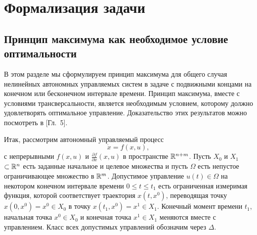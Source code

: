 \section{Формализация задачи}

\subsection{Принцип максимума как необходимое условие оптимальности}

В этом разделе мы сформулируем принцип максимума для общего случая нелинейных автономных управляемых систем в задаче с подвижными концами на конечном или бесконечном интервале времени. Принцип максимума, вместе с условиями трансверсальности, является необходимым условием, которому должно удовлетворять оптимальное управление. Доказательство этих результатов можно посмотреть в \cite{li}[Гл.~5].
        
Итак, рассмотрим автономный управляемый процесс
$$
        \dot x = f(x, u),
$$
с непрерывными $f(x, u)$ и $\frac{\partial f}{\partial x}(x, u)$ в пространстве $\mathbb{R}^{n+m}$. Пусть $X_0$ и $X_1$ $\subset \mathbb{R}^n$ есть заданные начальное и целевое множества и пусть $\Omega$ есть непустое ограничивающее множество в $\mathbb{R}^m$. Допустимое управление $u(t) \in \Omega$ на некотором конечном интервале времени $0 \leqslant t \leqslant t_1$ есть ограниченная измеримая функция, которой соответствует траектория $x(t, x^0)$, переводящая точку $x(0, x^0) = x^0 \in X_0$ в точку $x(t_1, x^0) = x^1 \in X_1$. Конечный момент времени $t_1$, начальная точка $x^0 \in X_0$ и конечная точка $x^1 \in X_1$ меняются вместе с управлением. Класс всех допустимых управлений обозначим через $\Delta$.
        
